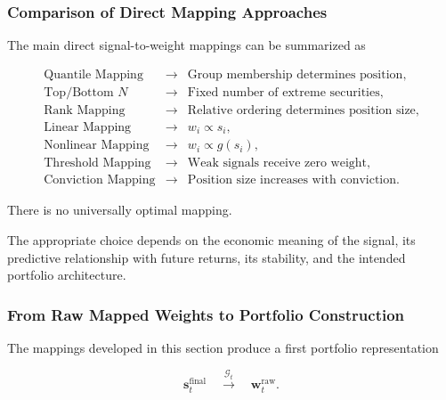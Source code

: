 \documentclass[11pt,a4paper]{article}
\begin{document}
\subsubsection{Comparison of Direct Mapping Approaches}

The main direct signal-to-weight mappings can be summarized as

\begin{equation}
\boxed{
\begin{array}{lll}
\text{Quantile Mapping}
&
\rightarrow
&
\text{Group membership determines position},
\\[0.15cm]
\text{Top/Bottom }N
&
\rightarrow
&
\text{Fixed number of extreme securities},
\\[0.15cm]
\text{Rank Mapping}
&
\rightarrow
&
\text{Relative ordering determines position size},
\\[0.15cm]
\text{Linear Mapping}
&
\rightarrow
&
w_i\propto s_i,
\\[0.15cm]
\text{Nonlinear Mapping}
&
\rightarrow
&
w_i\propto g(s_i),
\\[0.15cm]
\text{Threshold Mapping}
&
\rightarrow
&
\text{Weak signals receive zero weight},
\\[0.15cm]
\text{Conviction Mapping}
&
\rightarrow
&
\text{Position size increases with conviction}.
\end{array}
}
\end{equation}

There is no universally optimal mapping.

The appropriate choice depends on the economic meaning of the signal, its
predictive relationship with future returns, its stability, and the intended
portfolio architecture.


\subsubsection{From Raw Mapped Weights to Portfolio Construction}

The mappings developed in this section produce a first portfolio representation

\begin{equation}
\boxed{
\mathbf{s}_t^{\mathrm{final}}
\quad
\overset{\mathcal{G}_t}{\longrightarrow}
\quad
\mathbf{w}_t^{\mathrm{raw}}.
}
\end{equation}
\end{document}

